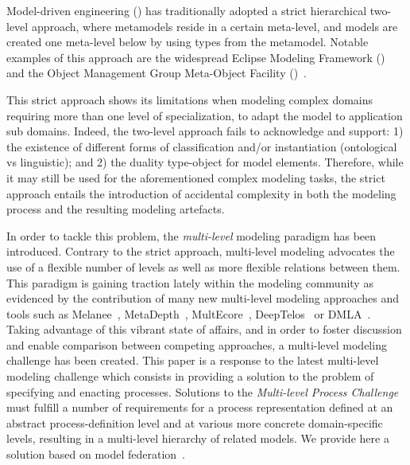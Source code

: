 Model-driven engineering (\MDE) has traditionally adopted a strict hierarchical two-level approach, where metamodels reside in a certain meta-level, and models are created one meta-level below by using types from the metamodel. Notable examples of this approach are the widespread Eclipse Modeling Framework (\EMF)~\parencite{emf} and the Object Management Group Meta-Object Facility (\MOF)~\parencite{omg2013mof}.

This strict approach shows its limitations when modeling complex domains requiring more than one level of specialization, \eg to adapt the model to application sub domains. Indeed, the two-level approach fails to acknowledge and support: 1) the existence of different forms of classification and/or instantiation (\eg ontological vs linguistic); and 2) the duality type-object for model elements. Therefore, while it may still be used for the aforementioned complex modeling tasks, the strict approach entails the introduction of accidental complexity in both the modeling process and the resulting modeling artefacts.

In order to tackle this problem, the \emph{multi-level} modeling paradigm has been introduced. Contrary to the strict approach, multi-level modeling advocates the use of a flexible number of levels as well as more flexible relations between them. This paradigm is gaining traction lately within the modeling community as evidenced by the contribution of many new multi-level modeling approaches and tools such as Melanee~\parencite{melanee}, MetaDepth~\parencite{metadepth}, MultEcore~\parencite{multecore2016}, DeepTelos~\parencite{deeptelos2016} or DMLA~\parencite{dmla2017}. Taking advantage of this vibrant state of affairs, and in order to foster discussion and enable comparison between competing approaches, a multi-level modeling challenge has been created. This paper is a response to the latest multi-level modeling challenge
which consists in providing a solution to the problem of specifying and enacting processes. Solutions to the \emph{Multi-level Process Challenge} must fulfill a number of requirements for a process representation defined at an abstract process-definition level and at various more concrete domain-specific levels, resulting in a multi-level hierarchy of related models. We provide here a solution based on model federation~\parencite{Golra2016-federation}.

